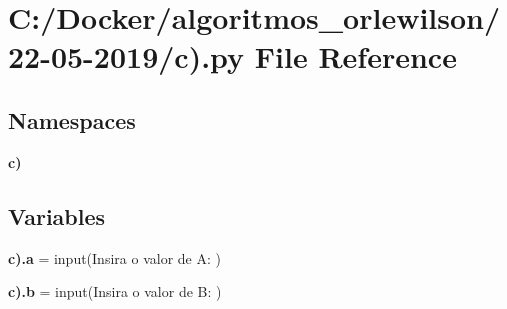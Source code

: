 \section{C\+:/\+Docker/algoritmos\+\_\+orlewilson/22-\/05-\/2019/c).py File Reference}
\label{c_08_8py}
\subsection*{Namespaces}
\begin{DoxyCompactItemize}
\item 
 \textbf{ c)}
\end{DoxyCompactItemize}
\subsection*{Variables}
\begin{DoxyCompactItemize}
\item 
\textbf{ c).\+a} = input(\textquotesingle{}Insira o valor de A\+: \textquotesingle{})
\item 
\textbf{ c).\+b} = input(\textquotesingle{}Insira o valor de B\+: \textquotesingle{})
\end{DoxyCompactItemize}

